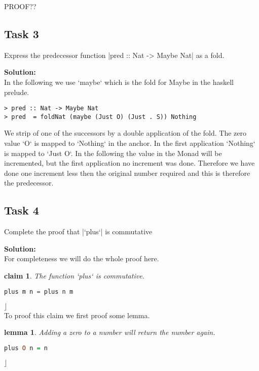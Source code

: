 \documentclass[11pt,a4paper,ngerman]{article}
\newtheorem{lemma}{\bfseries lemma}
\newtheorem{claim}{\bfseries claim}
\begin{document}
PROOF??

\subsection*{Task 3}

Express the predecessor function |pred :: Nat -> Maybe Nat| as
a fold.

\textbf{Solution:}\\

In the following we use `maybe` which is the fold for Maybe in the haskell prelude.

\begin{lstlisting}
> pred :: Nat -> Maybe Nat
> pred  = foldNat (maybe (Just O) (Just . S)) Nothing
\end{lstlisting}

We strip of one of the successors by a double application of the fold. The zero value `O` is mapped to `Nothing`
in the anchor. In the first application `Nothing` is mapped to `Just O`. In the following the value in the Monad
will be incremented, but the first application no increment was done. Therefore we have done one increment less
then the original number required and this is therefore the predecessor.\\

\subsection*{Task 4}

Complete the proof that |`plus`| is commutative

\textbf{Solution:}\\

For completeness we will do the whole proof here.

\begin{claim} \label{funke:ueb1:plus:commu}
   The function `plus` is commutative.
\begin{lstlisting}[language=haskell]
plus m n = plus n m
\end{lstlisting}
\end{claim}
\mbox{}\hfill$\rfloor$\\

To proof this claim we first proof some lemma.

\begin{lemma} \label{funke:ueb1:plus:commu:lemma1}
Adding a zero to a number will return the number again.
\begin{lstlisting}[language=haskell]
plus O n = n
\end{lstlisting}
\mbox{}\hfill$\rfloor$\\
\end{lemma}
\end{document}
